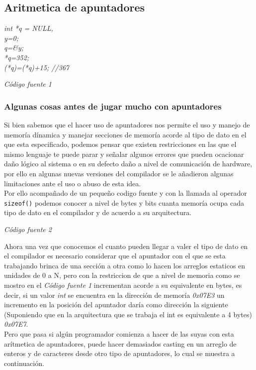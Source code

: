 \documentclass[10pt,executivepaper]{article}
\newcommand\tab[1][1cm]{\hspace*{#1}}
\begin{document}
\subsection{Aritmetica de apuntadores}
\tab \textit{int *q = NULL,\\ \tab y=0;\\ \tab q=\&y;\\ \tab *q=352;\\ \tab (*q)=(*q)+15; //367}

\begin{center}
\textit{Código fuente 1}
\end{center}
\subsubsection{Algunas cosas antes de jugar mucho con apuntadores}
Si bien sabemos que el hacer uso de apuntadores nos permite el uso y manejo de memoría dínamica y manejar secciones de memoría acorde al tipo de dato en el que esta especificado, podemos pensar que existen restricciones en las que el mismo lenguaje te puede parar y señalar algunos errores que pueden ocacionar daño lógico al sistema o en su defecto daño a nivel de comunicación de hardware, por ello en algunas nuevas versiones del compilador se le añadieron algunas limitaciones ante el uso o abuso de esta idea.\\
Por ello acompañado de un pequeño codigo fuente y con la llamada al operador \texttt{sizeof()} podemos conocer a nivel de bytes y bits cuanta memoría ocupa cada tipo de dato en el compilador y de acuerdo a su arquitectura.

\begin{center}
\textit{Código fuente 2}
\end{center}
Ahora una vez que conocemos el cuanto pueden llegar a valer el tipo de dato en el compilador es necesario considerar que el apuntador con el que se esta trabajando brinca de una sección a otra como lo hacen los arreglos estaticos en unidades de 0 a N, pero con la restriccion de que a nivel de memoria como se mostro en el \textit{Código fuente 1} incrementan acorde a su equivalente en bytes, es decir, si un valor \textsl{int} se encuentra en la dirección de memoría \textsl{0x07E3} un incremento en la posición del apuntador daría como dirección la siguiente (Suponiendo que en la arquitectura que se trabaja el int es equivalente a 4 bytes) \textsl{0x07E7}.\\
Pero que pasa si algún programador comienza a hacer de las suyas con esta arítmetica de apuntadores, puede hacer demasiados casting en un arreglo de enteros y de caracteres desde otro tipo de apuntadores, lo cual se muestra a continuación.
\end{document}
